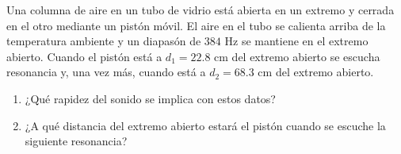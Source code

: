 \item Una columna de aire en un tubo de vidrio está abierta en un extremo y cerrada en el otro mediante un pistón móvil. El aire en el tubo se calienta arriba de la temperatura ambiente y un diapasón de $384\text{ Hz}$ se mantiene en el extremo abierto. Cuando el pistón está a $d_1 = 22.8\text{ cm}$ del extremo abierto se escucha resonancia y, una vez más, cuando está a $d_2 = 68.3\text{ cm}$ del extremo abierto.
\begin{enumerate}
    \item ¿Qué rapidez del sonido se implica con estos datos?
    \item ¿A qué distancia del extremo abierto estará el pistón cuando se escuche la siguiente resonancia?
\end{enumerate}